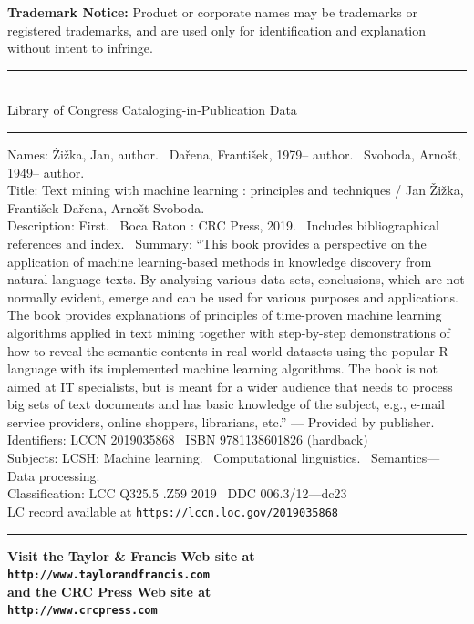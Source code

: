 \documentclass[twoside,11pt]{book}
\begin{document}
{{\textbf{Trademark Notice:}
Product or corporate names may be trademarks or registered trademarks,
and are used only for identification and explanation without intent to infringe.\\[0.25em]
}
\begin{center}
\begin{minipage}{0.675\textwidth}  %

\centering
\rule{\linewidth}{0.4pt}\\[0.4em]
Library of Congress Cataloging-in-Publication Data\\[0.4em]
\rule{\linewidth}{0.3pt}

\vspace{0.8em}

\raggedright
Names: Žižka, Jan, author. \textbar\ Dařena, František, 1979– author. \textbar\ Svoboda, Arnošt, 1949– author.\\
Title: Text mining with machine learning : principles and techniques / Jan Žižka, František Dařena, Arnošt Svoboda.\\
Description: First. \textbar\ Boca Raton : CRC Press, 2019. \textbar\ Includes bibliographical references and index. \textbar\
Summary: “This book provides a perspective on the application of machine learning-based methods in knowledge discovery from natural language texts. By analysing various data sets, conclusions, which are not normally evident, emerge and can be used for various purposes and applications. The book provides explanations of principles of time-proven machine learning algorithms applied in text mining together with step-by-step demonstrations of how to reveal the semantic contents in real-world datasets using the popular R-language with its implemented machine learning algorithms. The book is not aimed at IT specialists, but is meant for a wider audience that needs to process big sets of text documents and has basic knowledge of the subject, e.g., e-mail service providers, online shoppers, librarians, etc.” — Provided by publisher.\\
Identifiers: LCCN 2019035868 \textbar\ ISBN 9781138601826 (hardback)\\
Subjects: LCSH: Machine learning. \textbar\ Computational linguistics. \textbar\ Semantics—Data processing.\\
Classification: LCC Q325.5 .Z59 2019 \textbar\ DDC 006.3/12—dc23\\
LC record available at \texttt{https://lccn.loc.gov/2019035868}\\[0.8em]

\rule{\linewidth}{0.4pt}

\end{minipage}
\end{center}

\vspace{1em}
{\setlength{\parindent}{0pt}
\noindent
\textbf{Visit the Taylor \& Francis Web site at\\
 \texttt{http://www.taylorandfrancis.com}\\[0.5em]
and the CRC Press Web site at \\
 \texttt{http://www.crcpress.com}}
}
}
\end{document}
